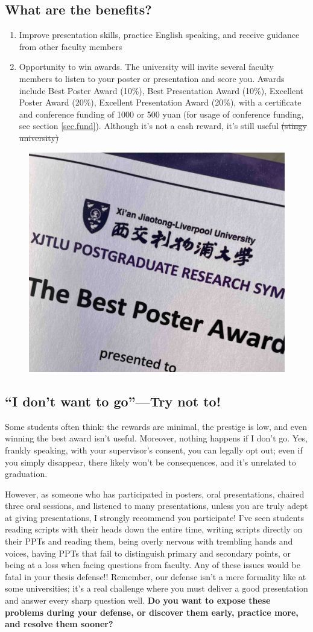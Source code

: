 \subsection{What are the benefits?}

\begin{enumerate}
    \item Improve presentation skills, practice English speaking, and receive guidance from other faculty members
    \item Opportunity to win awards. The university will invite several faculty members to listen to your poster or presentation and score you. Awards include Best Poster Award (10\%), Best Presentation Award (10\%), Excellent Poster Award (20\%), Excellent Presentation Award (20\%), with a certificate and conference funding of 1000 or 500 yuan (for usage of conference funding, see section \ref{sec.fund}). Although it's not a cash reward, it's still useful \sout{(stingy university)}
\end{enumerate}

\begin{figure}[H]
    \centering
    \includegraphics[width=0.4\columnwidth]{author-folder/Kai.Wu/poster_award.jpg}
\end{figure}

\subsection{“I don't want to go”—Try not to!}

Some students often think: the rewards are minimal, the prestige is low, and even winning the best award isn't useful. Moreover, nothing happens if I don't go. Yes, frankly speaking, with your supervisor's consent, you can legally opt out; even if you simply disappear, there likely won't be consequences, and it's unrelated to graduation.

However, as someone who has participated in posters, oral presentations, chaired three oral sessions, and listened to many presentations, unless you are truly adept at giving presentations, I strongly recommend you participate! I've seen students reading scripts with their heads down the entire time, writing scripts directly on their PPTs and reading them, being overly nervous with trembling hands and voices, having PPTs that fail to distinguish primary and secondary points, or being at a loss when facing questions from faculty. Any of these issues would be fatal in your thesis defense!! Remember, our defense isn't a mere formality like at some universities; it's a real challenge where you must deliver a good presentation and answer every sharp question well. \textbf{Do you want to expose these problems during your defense, or discover them early, practice more, and resolve them sooner?}

